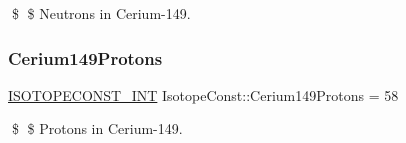 \$ \$ Neutrons in Cerium-\/149. \mbox{\label{group___isotope_const-_cerium-_ce149_ga1458bca64e411bfe10b4dd7eb8f981ef}} 
\subsubsection{\texorpdfstring{Cerium149\+Protons}{Cerium149Protons}}
{\footnotesize\ttfamily \mbox{\hyperlink{group___isotope_const-_macros_ga5f18360b3e99483a35c32d789e62621c}{I\+S\+O\+T\+O\+P\+E\+C\+O\+N\+S\+T\+\_\+\+I\+NT}} Isotope\+Const\+::\+Cerium149\+Protons = 58}

\$ \$ Protons in Cerium-\/149. 